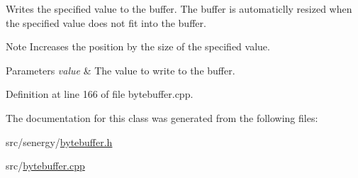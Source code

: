 Writes the specified value to the buffer. The buffer is automaticlly resized when the specified value does not fit into the buffer. 

\begin{DoxyNote}{Note}
Increases the position by the size of the specified value.
\end{DoxyNote}

\begin{DoxyParams}{Parameters}
{\em value} & The value to write to the buffer. \\
\hline
\end{DoxyParams}


Definition at line 166 of file bytebuffer.\-cpp.



The documentation for this class was generated from the following files\-:\begin{DoxyCompactItemize}
\item 
src/senergy/\hyperlink{bytebuffer_8h}{bytebuffer.\-h}\item 
src/\hyperlink{bytebuffer_8cpp}{bytebuffer.\-cpp}\end{DoxyCompactItemize}

